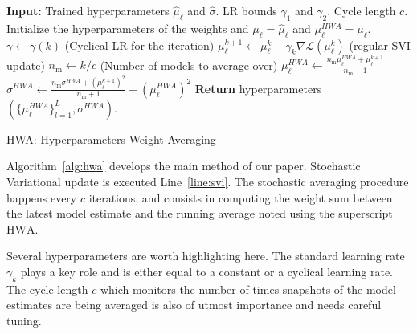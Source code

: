 \documentclass{article} %
\begin{document}
\begin{algorithm}[H]
\begin{algorithmic}[1]
\STATE \textbf{Input:} Trained hyperparameters $\hat{\mu}_{\ell}$ and $\hat{\sigma}$. LR bounds $\gamma_1$ and $\gamma_2$. Cycle length $c$.
\STATE Initialize the hyperparameters of the weights and 
$\mu_{\ell} = \hat{\mu}_{\ell}$ and $\mu^{HWA}_{\ell} = \mu_{\ell}$.
\STATE $\gamma \leftarrow \gamma(k)$ (Cyclical LR for the iteration)
\STATE $\mu_{\ell}^{k+1} \leftarrow \mu_{\ell}^{k} - \gamma_k \nabla \mathcal{L}(\mu_{\ell}^{k})$ (regular SVI update) \label{line:svi}
	\STATE \qquad $n_{\textrm{m}} \leftarrow k/c$ \quad (Number of models to average over)
		\STATE \qquad$\mu_{\ell}^{HWA} \leftarrow \frac{n_{\textrm{m}}\mu_{\ell}^{HWA} + \mu_{\ell}^{k+1}}{n_{\textrm{m}}+1}$
		\STATE \qquad $\sigma^{HWA} \leftarrow \frac{n_{\textrm{m}}\sigma^{HWA} + (\mu_{\ell}^{k+1})^2}{n_{\textrm{m}}+1} -( \mu_{\ell}^{HWA})^2 $
\ENDIF
\ENDFOR
\STATE \textbf{Return} hyperparameters $(\{\mu_{\ell}^{HWA}\}_{l=1}^L, \sigma^{HWA})$.
\end{algorithmic}
\caption{HWA: Hyperparameters Weight Averaging}
\label{alg:hwa}
\end{algorithm}

Algorithm~\ref{alg:hwa} develops the main method of our paper.
Stochastic Variational update is executed Line~\ref{line:svi}.
The stochastic averaging procedure happens every $c$ iterations, and consists in computing the weight sum between the latest model estimate and the running average noted using the superscript $\textrm{HWA}$.

Several hyperparameters are worth highlighting here.
The standard learning rate $\gamma_k$ plays a key role and is either equal to a constant or a cyclical learning rate.
The cycle length $c$ which monitors the number of times snapshots of the model estimates are being averaged is also of utmost importance and needs careful tuning.

%
\end{document}
